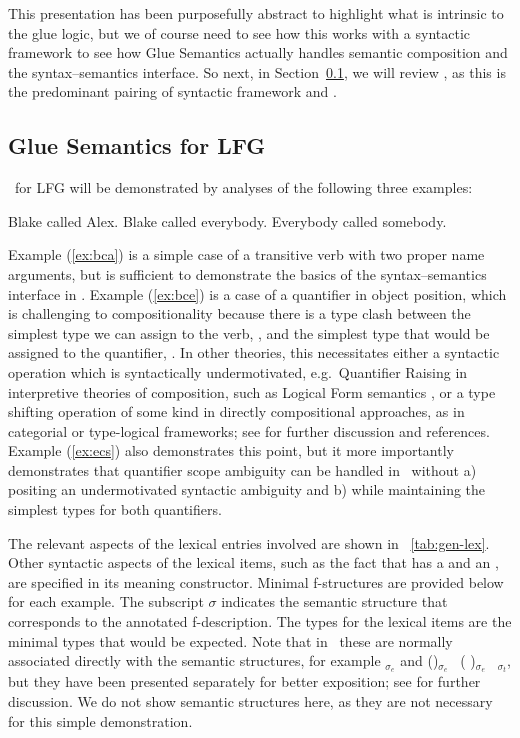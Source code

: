 This presentation has been purposefully abstract to highlight what is
intrinsic to the glue logic, but we of course need to see how this
 works with a syntactic framework to see how Glue Semantics
actually handles semantic composition and the syntax--semantics interface. So next, in
Section~\ref{sec:glue-lfg}, we will review \lfgglue, as this
is the predominant pairing of syntactic framework and \glue.

\subsection{Glue Semantics for LFG}
\label{sec:glue-lfg}

\glue\ for LFG will be demonstrated by analyses of the following three
examples:
%
\begin{exe}
\ex \label{ex:bca} Blake called Alex.
\ex \label{ex:bce} Blake called everybody.
\ex \label{ex:ecs} Everybody called somebody.
\end{exe}
%
Example (\ref{ex:bca}) is a simple case of a transitive verb with two
proper name arguments, but is sufficient to demonstrate the basics of
the syntax--semantics interface in \lfgglue. Example (\ref{ex:bce}) is a
case of a quantifier in object position, which is challenging to
compositionality because there is a type clash between the simplest
type we can assign to the verb, , and the
simplest type that would be assigned to the  quantifier,
. In other theories, this necessitates either
a syntactic operation which is syntactically undermotivated, e.g.\  
Quantifier Raising in interpretive theories of composition, such as Logical Form semantics \citep{heim;kratzer98},
or a type shifting operation of some kind in directly compositional
approaches, as in categorial or type-logical frameworks; see
\citet{jacobson14} for further discussion and references. Example
(\ref{ex:ecs}) also demonstrates this point, but it more importantly
demonstrates that quantifier scope ambiguity can be handled in \glue\
without a) positing an undermotivated syntactic ambiguity and b) while
maintaining the simplest types for both quantifiers.

The relevant aspects of the lexical entries
involved are shown in \tablew~\ref{tab:gen-lex}.  Other syntactic aspects of the lexical items, such as the fact that  
\word{called} has a \feat{subject} and an , are specified
in its meaning constructor. Minimal f-structures are
provided below for each example. The subscript $\sigma$ indicates the
semantic structure that corresponds to the annotated
f-description. The types for the lexical items are the minimal types
that would be expected. Note that in \glue\ these are normally
associated directly with the semantic structures, for example
\Up$_{\sigma{_e}}$ and (\up \feat{obj})$_{\sigma{_e}}$ \linimp\ (\up
\feat{subj})$_{\sigma{_e}}$ \linimp\ \Up$_{\sigma{_t}}$, but they have
been presented separately for better exposition; see
\citet[299--305]{dalrymple;ea19} for further discussion. We do not
show semantic structures here, as they are not necessary for this
simple demonstration. 


